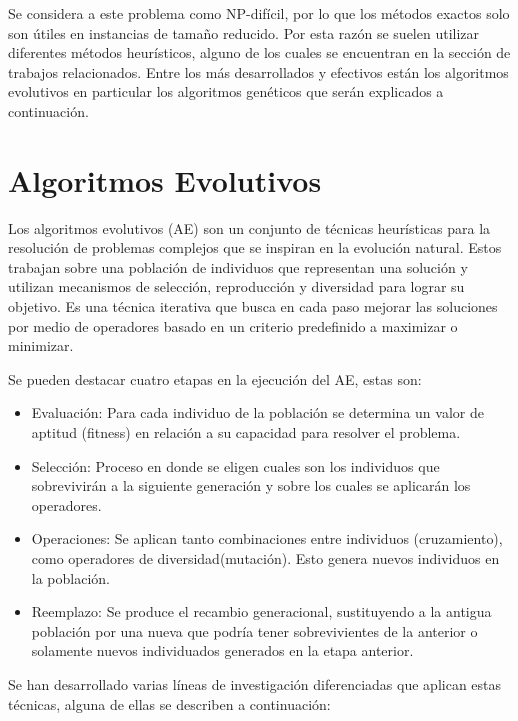Se considera a este problema como NP-difícil, por lo que los métodos exactos solo son útiles en instancias de tamaño reducido. Por esta razón se suelen utilizar diferentes métodos heurísticos, alguno de los cuales se encuentran en la sección de trabajos relacionados. Entre los más desarrollados y efectivos están los algoritmos evolutivos en particular los algoritmos genéticos que serán explicados a continuación.

\section{Algoritmos Evolutivos}

Los algoritmos evolutivos (AE) son un conjunto de técnicas heurísticas para la resolución de problemas complejos que se inspiran en la evolución natural. Estos trabajan sobre una población de individuos que representan una solución y utilizan mecanismos de selección, reproducción y diversidad para lograr su objetivo. 
Es una técnica iterativa que busca en cada paso mejorar las soluciones por medio de operadores basado en un criterio predefinido a maximizar o minimizar.

Se pueden destacar cuatro etapas en la ejecución del AE, estas son:

\begin{itemize}
	\item Evaluación: Para cada individuo de la población se determina un valor de aptitud (fitness) en relación a su capacidad para resolver el problema. 
	\item Selección: Proceso en donde se eligen cuales son los individuos que sobrevivirán a la siguiente generación y sobre los cuales se aplicarán los operadores.
	\item Operaciones: Se aplican tanto combinaciones entre individuos (cruzamiento), como operadores de diversidad(mutación). Esto genera nuevos individuos en la población.
	\item Reemplazo: Se produce el recambio generacional, sustituyendo a la antigua población por una nueva que podría tener sobrevivientes de la anterior o solamente nuevos individuados generados en la etapa anterior.
\end{itemize}

Se han desarrollado varias líneas de investigación diferenciadas que aplican estas técnicas, alguna de ellas se describen a continuación:

